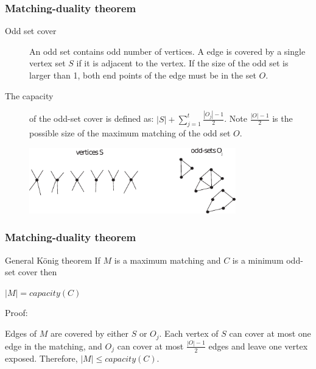 \documentclass[hyperref={pdfpagelabels=false}]{beamer}
\begin{document}
\frame
{
	\frametitle{Matching-duality theorem}
	
	\begin{description}
	\item[Odd set cover] An odd set contains odd number of vertices. A edge is covered by a single vertex set $S$ if it is adjacent to the vertex. If the size of the odd set is larger than 1, both end points of the edge must be in the set $O$.
	\item[The capacity] of the odd-set cover is defined as: $|S| + \sum\limits_{j=1}^{t} \frac{|O_{j}| - 1}{2}$.
	Note $\frac{|O| - 1}{2}$ is the possible size of the maximum matching of the odd set $O$.
	\end{description}
	
	\begin{figure}[htb]
	\centering
	\includegraphics[width=0.8\textwidth]{figures/oddset.pdf}
	\end{figure}
}

\frame
{
	\frametitle{Matching-duality theorem}
	
	\begin{block}{General K\"{o}nig theorem}
		If $M$ is a maximum matching and $C$ is a minimum odd-set cover then
		\begin{center}
		$|M| = capacity(C)$
		\end{center}
	\end{block}
	
	\begin{itemize}
	{
		\item Proof:
		
		\bigskip
		Edges of $M$ are covered by either $S$ or $O_{j}$. Each vertex of $S$ can cover at most one edge in the matching, and $O_{j}$ can cover at most $\frac{|O| - 1}{2}$ edges and leave one vertex exposed. Therefore, $|M| \leq capacity(C)$.
	}
	\end{itemize}
}
\end{document}
